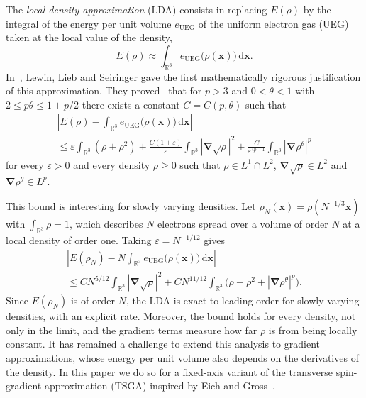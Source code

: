 \documentclass[final,reqno]{amsart}
\theoremstyle{remark}
\renewcommand{\le}{\leqslant}
\renewcommand{\ge}{\geqslant}
\renewcommand{\epsilon}{\varepsilon}
\newcommand{\RR}{\mathbb{R}}
\newcommand{\UEG}{\mathrm{UEG}}
\newcommand{\grad}{\bm{\nabla}}
\newcommand{\dd}{\mathrm{d}}
\begin{document}
The \emph{local density approximation} (LDA) consists in replacing $E(\rho)$ by the integral of the energy per unit volume $e_\UEG$ of the uniform electron gas (UEG) taken at the local value of the density,
\[
 E(\rho)\approx\int_{\RR^3}e_\UEG\big(\rho(\mathbf{x})\big)\,\dd \mathbf{x}.
\]
In~\cite{lewin2020local}, Lewin, Lieb and Seiringer gave the first mathematically rigorous justification of this approximation. They proved~\cite[Theorem~3]{lewin2020local} that for $p>3$ and $0<\theta<1$ with $2\le p\theta\le1+p/2$ there exists a constant $C=C(p,\theta)$ such that
\begin{multline*}
 \left|E(\rho)-\int_{\RR^3}e_\UEG\big(\rho(\mathbf{x})\big)\,\dd\mathbf{x}\right|\\
 \le\epsilon\int_{\RR^3}(\rho+\rho^2)
 +\frac{C(1+\epsilon)}{\epsilon}\int_{\RR^3}|\grad\sqrt{\rho}|^2
 +\frac{C}{\epsilon^{4p-1}}\int_{\RR^3}|\grad\rho^\theta|^p
\end{multline*}
for every $\epsilon>0$ and every density $\rho\ge0$ such that $\rho\in L^1\cap L^2$, $\grad\sqrt{\rho}\in L^2$ and $\grad\rho^\theta\in L^p$.

This bound is interesting for slowly varying densities. Let $\rho_N(\mathbf{x})=\rho(N^{-1/3}\mathbf{x})$ with $\int_{\RR^3}\rho=1$, which describes $N$ electrons spread over a volume of order $N$ at a local density of order one. Taking $\epsilon=N^{-1/12}$ gives~\cite[Eq.~(9)]{lewin2020local}
\begin{multline}\label{eq:LLS_rate}
 \left|E(\rho_N)-N\int_{\RR^3}e_\UEG\big(\rho(\mathbf{x})\big)\,\dd\mathbf{x}\right|\\
 \le CN^{5/12}\int_{\RR^3}|\grad\sqrt{\rho}|^2+CN^{11/12}\int_{\RR^3}\big(\rho+\rho^2+|\grad\rho^\theta|^p\big).
\end{multline}
Since $E(\rho_N)$ is of order $N$, the LDA is exact to leading order for slowly varying densities, with an explicit rate. Moreover, the bound holds for every density, not only in the limit, and the gradient terms measure how far $\rho$ is from being locally constant. It has remained a challenge to extend this analysis to gradient approximations, whose energy per unit volume also depends on the derivatives of the density. In this paper we do so for a fixed-axis variant of the transverse spin-gradient approximation (TSGA) inspired by Eich and Gross~\cite{eich2013transverse}.
\end{document}
